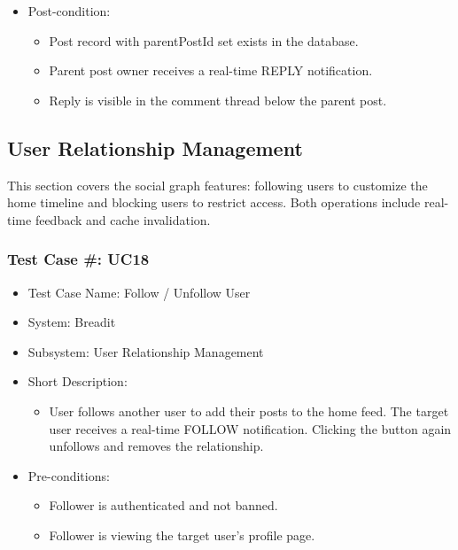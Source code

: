 \begin{itemize}
  \item Post-condition:
\begin{itemize}
  \item Post record with parentPostId set exists in the database.
  \item Parent post owner receives a real-time REPLY notification.
  \item Reply is visible in the comment thread below the parent post.
\end{itemize}
\end{itemize}

\subsection{User Relationship Management}

This section covers the social graph features: following users to customize the home timeline and blocking users to restrict access. Both operations include real-time feedback and cache invalidation.

\subsubsection{Test Case \#: UC18}
\begin{itemize}
  \item Test Case Name: Follow / Unfollow User
  \item System: Breadit
  \item Subsystem: User Relationship Management
  \item Short Description:
\begin{itemize}
  \item User follows another user to add their posts to the home feed. The target user receives a real-time FOLLOW notification. Clicking the button again unfollows and removes the relationship.
\end{itemize}
  \item Pre-conditions:
\begin{itemize}
  \item Follower is authenticated and not banned.
  \item Follower is viewing the target user's profile page.
\end{itemize}
\end{itemize}

